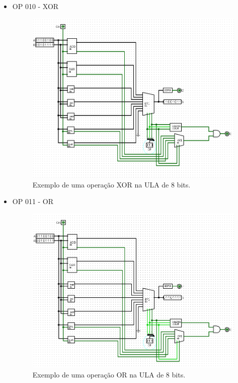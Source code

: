 \documentclass[
	12pt,				%
	openright,			%
	twoside,			%
	a4paper,			%
	english,			%
	french,				%
	spanish,			%
	brazil,				%
	]{abntex2}
\begin{document}
\begin{apendicesenv}
\begin{itemize}
\newpage
\item{OP 010 - XOR}

\begin{figure}[H]
	\begin{center}
	    \includegraphics[scale=0.5]{alu8010xor.png}
	\end{center}
\caption{\label{alu8010xor}Exemplo de uma operação XOR na ULA de 8 bits.}
\end{figure}

\newpage
\item{OP 011 - OR}

\begin{figure}[H]
	\begin{center}
	    \includegraphics[scale=0.5]{alu8011or.png}
	\end{center}
\caption{\label{alu8011or}Exemplo de uma operação OR na ULA de 8 bits.}
\end{figure}


\end{itemize}
\end{apendicesenv}
\end{document}
